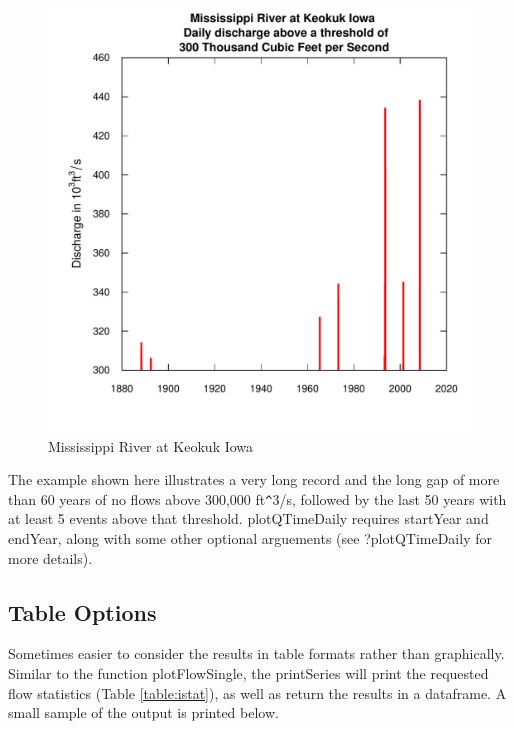 \documentclass[a4paper,11pt]{article}\usepackage{graphicx, color}
\newenvironment{knitrout}{}{} %
\begin{document}
\begin{knitrout}
\begin{figure}[]
\includegraphics[width=1\linewidth,height=1\linewidth]{figure/Mississippi} \caption[Mississippi River at Keokuk Iowa]{Mississippi River at Keokuk Iowa\label{fig:Mississippi}}
\end{figure}


\end{knitrout}


The example shown here illustrates a very long record and the long gap of more than 60 years of no flows above 300,000 ft\verb|^|3/s, followed by the last 50 years with at least 5 events above that threshold. plotQTimeDaily requires startYear and endYear, along with some other optional arguements (see ?plotQTimeDaily for more details).

\FloatBarrier

\subsection{Table Options}
\label{sec:tableOptions}
Sometimes easier to consider the results in table formats rather than graphically. Similar to the function plotFlowSingle, the printSeries will print the requested flow statistics (Table \ref{table:istat}), as well as return the results in a dataframe. A small sample of the output is printed below.
\end{document}
